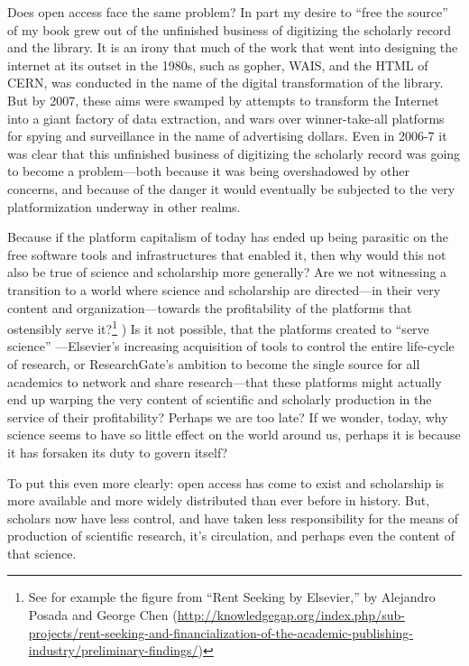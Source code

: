 \documentclass[11pt]{article}
\begin{document}
Does open access face the same problem?  In part my desire to ``free the source'' of my book grew out of the unfinished business of digitizing the scholarly record and the library.  It is an irony that much of the work that went into designing the internet at its outset in the 1980s, such as gopher, WAIS, and the HTML of CERN, was conducted in the name of the digital transformation of the library.  But by 2007, these aims were swamped by attempts to transform the Internet into a giant factory of data extraction, and wars over winner-take-all platforms for spying and surveillance in the name of advertising dollars.  Even in 2006-7 it was clear that this unfinished business of digitizing the scholarly record was going to become a problem---both because it was being overshadowed by other concerns, and because of the danger it would eventually be subjected to the very platformization underway in other realms. 

Because if the platform capitalism of today has ended up being parasitic on the free software tools and infrastructures that enabled it, then why would this not also be true of science and scholarship more generally?  Are we not witnessing a transition to a world where science and scholarship are directed---in their very content and organization---towards the profitability of the platforms that ostensibly serve it?\footnote{See for example the figure from ``Rent Seeking by Elsevier,'' by Alejandro Posada and George Chen  (\url{http://knowledgegap.org/index.php/sub-projects/rent-seeking-and-financialization-of-the-academic-publishing-industry/preliminary-findings/})} )  Is it not possible, that the platforms created to ``serve science'' ---Elsevier's increasing acquisition of tools to control the entire life-cycle of research, or ResearchGate's ambition to become the single source for all academics to network and share research---that these platforms might actually end up warping the very content of scientific and scholarly production in the service of their profitability?  Perhaps we are too late?  If we wonder, today, why science seems to have so little effect on the world around us, perhaps it is because it has forsaken its duty to govern itself?

To put this even more clearly: open access has come to exist and scholarship is more available and more widely distributed than ever before in history.  But, scholars now have less control, and have taken less responsibility for the means of production of scientific research, it's circulation, and perhaps even the content of that science.  
\end{document}
